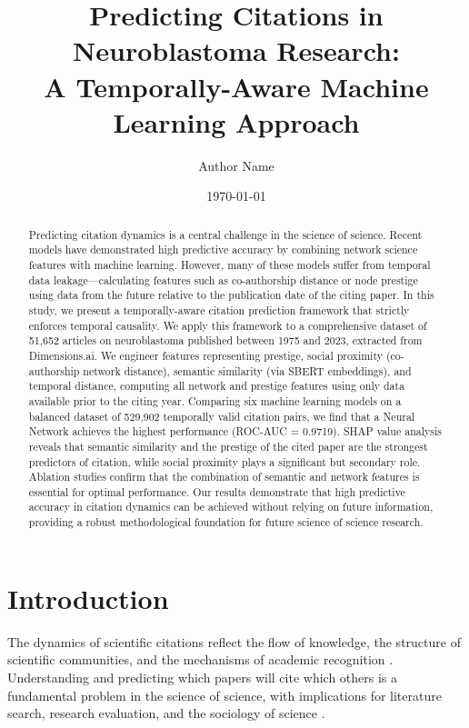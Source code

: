 \documentclass[11pt,a4paper]{article}
\title{Predicting Citations in Neuroblastoma Research: \\ A Temporally-Aware Machine Learning Approach}
\author[1]{Author Name}
\affil[1]{Institution}
\date{\today}
\begin{document}
\maketitle

\begin{abstract}
Predicting citation dynamics is a central challenge in the science of science. Recent models have demonstrated high predictive accuracy by combining network science features with machine learning. However, many of these models suffer from temporal data leakage—calculating features such as co-authorship distance or node prestige using data from the future relative to the publication date of the citing paper. In this study, we present a temporally-aware citation prediction framework that strictly enforces temporal causality. We apply this framework to a comprehensive dataset of 51,652 articles on neuroblastoma published between 1975 and 2023, extracted from Dimensions.ai. We engineer features representing prestige, social proximity (co-authorship network distance), semantic similarity (via SBERT embeddings), and temporal distance, computing all network and prestige features using only data available prior to the citing year. Comparing six machine learning models on a balanced dataset of 529,902 temporally valid citation pairs, we find that a Neural Network achieves the highest performance (ROC-AUC = 0.9719). SHAP value analysis reveals that semantic similarity and the prestige of the cited paper are the strongest predictors of citation, while social proximity plays a significant but secondary role. Ablation studies confirm that the combination of semantic and network features is essential for optimal performance. Our results demonstrate that high predictive accuracy in citation dynamics can be achieved without relying on future information, providing a robust methodological foundation for future science of science research.
\end{abstract}

\section{Introduction}
The dynamics of scientific citations reflect the flow of knowledge, the structure of scientific communities, and the mechanisms of academic recognition \citep{Wang2013, Fortunato2018}. Understanding and predicting which papers will cite which others is a fundamental problem in the science of science, with implications for literature search, research evaluation, and the sociology of science \citep{Zeng2017}.
\end{document}
